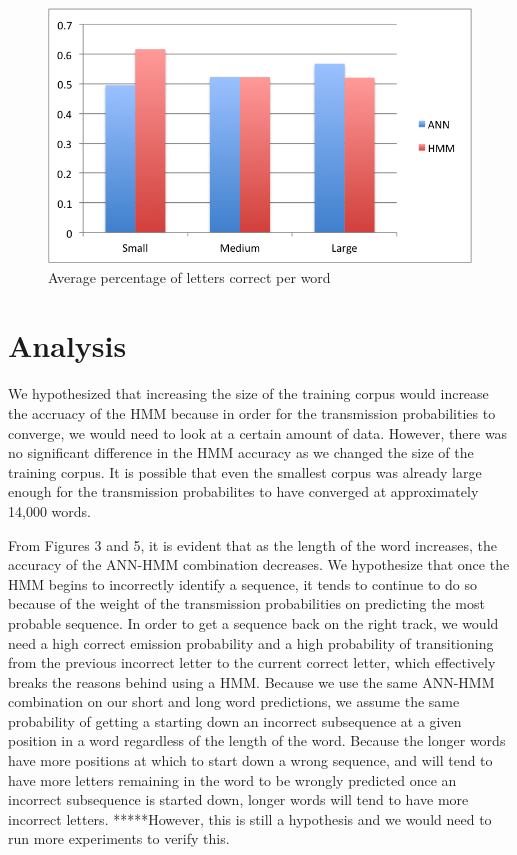 \documentclass[11pt,a4paper,twocolumn]{article}
\begin{document}
\begin{figure}[h]
\centering
\caption{Average percentage of letters correct per word}
\includegraphics[scale=0.55]{img/wordCorrectness.png}
\end{figure}


\section{Analysis}

We hypothesized that increasing the size of the training corpus would increase the accruacy of the HMM because in order for the transmission probabilities to converge, we would need to look at a certain amount of data. However, there was no significant difference in the HMM accuracy as we changed the size of the training corpus. It is possible that even the smallest corpus was already large enough for the transmission probabilites to have converged at approximately 14,000 words.

From Figures 3 and 5, it is evident that as the length of the word increases, the accuracy of the ANN-HMM combination decreases. We hypothesize that once the HMM begins to incorrectly identify a sequence, it tends to continue to do so because of the weight of the transmission probabilities on predicting the most probable sequence. In order to get a sequence back on the right track, we would need a high correct emission probability and a high probability of transitioning from the previous incorrect letter to the current correct letter, which effectively breaks the reasons behind using a HMM. Because we use the same ANN-HMM combination on our short and long word predictions, we assume the same probability of getting a starting down an incorrect subsequence at a given position in a word regardless of the length of the word. Because the longer words have more positions at which to start down a wrong sequence, and will tend to have more letters remaining in the word to be wrongly predicted once an incorrect subsequence is started down, longer words will tend to have more incorrect letters. *****However, this is still a hypothesis and we would need to run more experiments to verify this.
\end{document}
